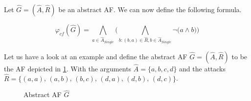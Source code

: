 \begin{definition}
    Let $\hat{G}=(\hat{A},\hat{R})$ be an abstract AF. We can now define the following formula.
    \begin{center}
        \[ \varphi_{cf}(\hat{G}) =
        \bigwedge_{a \in \hat{A}_{\mathit{Single}}} \bigl( \bigwedge_{b:(b,a)\in \hat{R}, b \in \hat{A}_{\mathit{Single}}} \lnot \bigl( a \wedge b \bigl) \bigl)
        \]
    \end{center}
    \label{def:booleanFormulaConflictFree}
\end{definition}


\begin{example}
    Let us have a look at an example and define the abstract AF $\hat{G} = (\hat{A}, \hat{R})$ to be the AF depicted in \cref{af:algorithmEncodingsConflictFree}. With the arguments $\hat{A}=\{a, b, c, d\}$ and the attacks $\hat{R}=\big\{ (a,a)$, $(a,b)$, $(b,c)$, $(d,a)$, $(d,b)$, $(d,c)\big\}$.

    \begin{figure}[H]
        \centering
        \caption{Abstract AF $\hat{G}$}
        \label{af:algorithmEncodingsConflictFree}
    \end{figure}


\end{example}
